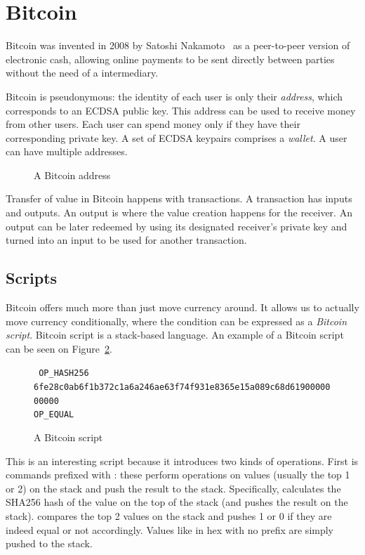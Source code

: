 \section{Bitcoin}
Bitcoin was invented in 2008 by Satoshi Nakamoto~\cite{bitcoin} as a peer-to-peer version of electronic cash, allowing online payments to be sent directly between parties without the need of a intermediary.

Bitcoin is pseudonymous: the identity of each user is only their \emph{address}, which corresponds to an ECDSA public key. This address can be used to receive money from other users. Each user can spend money only if they have their corresponding private key. A set of ECDSA keypairs comprises a \emph{wallet}. A user can have multiple addresses.

\begin{figure}
  \centering
  \caption{A Bitcoin address}
  \label{fig:address-example}
\end{figure}

Transfer of value in Bitcoin happens with transactions. A transaction has inputs and outputs. An output is where the value creation happens for the receiver. An output can be later redeemed by using its designated receiver's private key and turned into an input to be used for another transaction.

\subsection{Scripts}
Bitcoin offers much more than just move currency around. It allows us to actually move currency conditionally, where the condition can be expressed as a \emph{Bitcoin script}. Bitcoin script is a stack-based language. An example of a Bitcoin script can be seen on Figure~\ref{fig:bitcoin-script}.

\begin{figure}
  \centering
  {
    \tt
    OP\_HASH256 \\
    6fe28c0ab6f1b372c1a6a246ae63f74f931e8365e15a089c68d6190000000000 \\
    OP\_EQUAL
  }
  \caption{A Bitcoin script}
  \label{fig:bitcoin-script}
\end{figure}

This is an interesting script because it introduces two kinds of operations. First is commands prefixed with : these perform operations on values (usually the top 1 or 2) on the stack and push the result to the stack. Specifically,  calculates the SHA256 hash of the value on the top of the stack (and pushes the result on the stack).  compares the top 2 values on the stack and pushes 1 or 0 if they are indeed equal or not accordingly. Values like  in hex with no  prefix are simply pushed to the stack.

